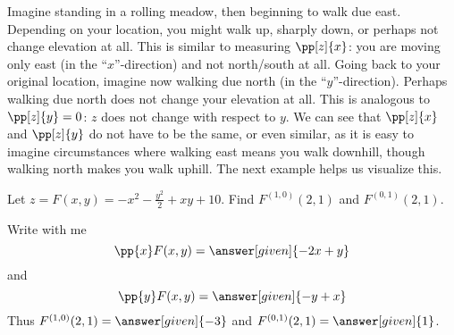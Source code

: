 \documentclass{ximera}
\begin{document}
Imagine standing in a rolling meadow, then beginning to walk due
east. Depending on your location, you might walk up, sharply down, or
perhaps not change elevation at all. This is similar to measuring
$\pp[z]{x}$: you are moving only east (in the ``$x$''-direction) and
not north/south at all. Going back to your original location, imagine
now walking due north (in the ``$y$''-direction). Perhaps walking due
north does not change your elevation at all. This is analogous to
$\pp[z]{y}=0$: $z$ does not change with respect to $y$. We can see
that $\pp[z]{x}$ and $\pp[z]{y}$ do not have to be the same, or even
similar, as it is easy to imagine circumstances where walking east
means you walk downhill, though walking north makes you walk uphill.
The next example helps us visualize this.


\begin{example}
  Let $z=F(x,y)=-x^2-\frac{y^2}{2}+xy+10$. Find $F^{(1,0)}(2,1)$ and
  $F^{(0,1)}(2,1)$.
  \begin{explanation}
    Write with me
    \[
    \pp{x}F(x,y) = \answer[given]{-2x+y}
    \]
    and
    \[
    \pp{y}F(x,y) = \answer[given]{-y+x}
    \]
    Thus $F^{(1,0)}(2,1) = \answer[given]{-3}$ and $F^{(0,1)}(2,1) =
    \answer[given]{1}$.
  \end{explanation}
\end{example}
\end{document}
